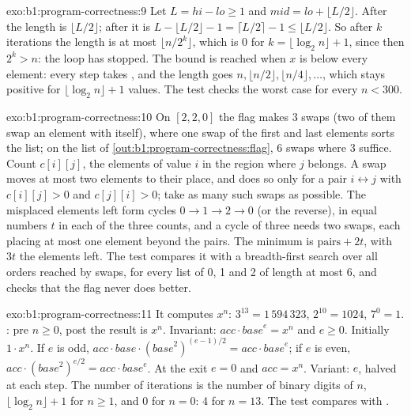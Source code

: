 \begin{solution}{exo:b1:program-correctness:9}
Let $L = hi - lo \geq 1$ and $mid = lo + \lfloor L/2 \rfloor$. After  the length is $\lfloor L/2 \rfloor$;
after  it is $L - \lfloor L/2 \rfloor - 1 = \lceil L/2 \rceil - 1 \leq \lfloor L/2 \rfloor$. So after
$k$ iterations the length is at most $\lfloor n/2^k \rfloor$, which is 0 for $k = \lfloor \log_2 n \rfloor + 1$, since
then $2^k > n$: the loop has stopped. The bound is reached when $x$ is below every element: every step takes
, and the length goes $n, \lfloor n/2 \rfloor, \lfloor n/4 \rfloor, \dots$, which stays positive for
$\lfloor \log_2 n \rfloor + 1$ values. The test checks the worst case for every $n < 300$.
\end{solution}

\begin{solution}{exo:b1:program-correctness:10}
On $[2, 2, 0]$ the flag makes 3 swaps (two of them swap an element with itself), where one swap of the first and
last elements sorts the list; on the list of \cref{out:b1:program-correctness:flag}, 6 swaps where 3 suffice.
Count $c[i][j]$, the elements of value $i$ in the region where $j$ belongs. A swap moves at most two elements to their
place, and does so only for a pair $i \leftrightarrow j$ with $c[i][j] > 0$ and $c[j][i] > 0$; take as many such
swaps as possible. The misplaced elements left form cycles $0 \to 1 \to 2 \to 0$ (or the reverse), in equal numbers
$t$ in each of the three counts, and a cycle of three needs two swaps, each placing at most one element beyond the
pairs. The minimum is $\text{pairs} + 2t$, with $3t$ the elements left. The test compares it with a breadth-first search
over all orders reached by swaps, for every list of 0, 1 and 2 of length at most 6, and checks that the flag never does
better.
\end{solution}

\begin{solution}{exo:b1:program-correctness:11}
It computes $x^n$: $3^{13} = 1\,594\,323$, $2^{10} = 1024$, $7^0 = 1$. : pre $n \geq 0$, post the result
is $x^n$. Invariant: $\mathit{acc} \cdot \mathit{base}^e = x^n$ and $e \geq 0$. Initially $1 \cdot x^n$. If $e$ is
odd, $\mathit{acc} \cdot \mathit{base} \cdot (\mathit{base}^2)^{(e - 1)/2} = \mathit{acc} \cdot \mathit{base}^e$; if
$e$ is even, $\mathit{acc} \cdot (\mathit{base}^2)^{e/2} = \mathit{acc} \cdot \mathit{base}^e$. At the exit $e = 0$ and
$\mathit{acc} = x^n$. Variant: $e$, halved at each step. The number of iterations is the number of binary digits of $n$,
$\lfloor \log_2 n \rfloor + 1$ for $n \geq 1$, and 0 for $n = 0$: 4 for $n = 13$. The test compares with .
\end{solution}

